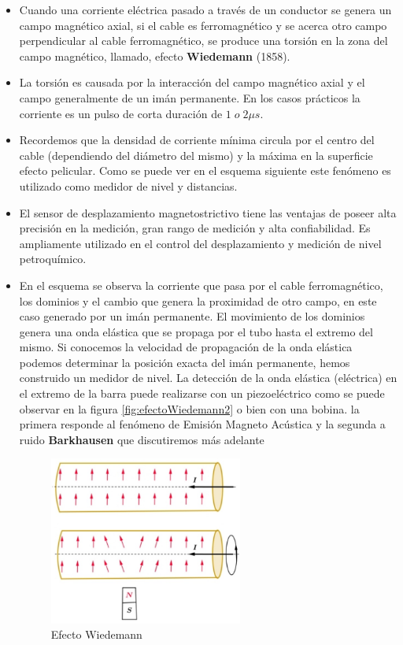 \begin{itemize}
	\item Cuando una corriente eléctrica pasado a través de un conductor se genera un campo magnético axial, si el cable es ferromagnético y se acerca otro campo perpendicular al cable ferromagnético, se produce una torsión en la zona del campo magnético, llamado, efecto \textbf{Wiedemann} (1858).

	\item La torsión es causada por la interacción del campo magnético axial y el campo generalmente de un imán permanente. En los casos prácticos la corriente es un pulso de corta duración de $1 \;o\; 2\mu s$.

	\item Recordemos que la densidad de corriente mínima circula por el centro del cable (dependiendo del diámetro del mismo) y la máxima en la superficie efecto pelicular. Como se puede ver en el esquema siguiente este fenómeno es utilizado como medidor de nivel y distancias.

	\item El sensor de desplazamiento magnetostrictivo tiene las ventajas de poseer alta precisión en la medición, gran rango de medición y alta confiabilidad. Es ampliamente utilizado en el control del desplazamiento y medición de nivel petroquímico.

	\item En el esquema se observa la corriente que pasa por el cable ferromagnético, los dominios y el cambio que genera la proximidad de otro campo, en este caso generado por un imán permanente. El movimiento de los dominios genera una onda elástica que se propaga por el tubo hasta el extremo del mismo. Si conocemos la velocidad de propagación de la onda elástica podemos determinar la posición exacta del imán permanente, hemos construido un medidor de nivel. La detección de la onda elástica (eléctrica) en el extremo de la barra puede realizarse con un piezoeléctrico como se puede observar en la figura \ref{fig:efectoWiedemann2} o bien con una bobina. la primera responde al fenómeno de Emisión Magneto Acústica y la segunda a ruido \textbf{Barkhausen} que discutiremos más adelante

\begin{figure}[H]
    \centering
    \includegraphics[width=0.6\textwidth]{./Figures/efectoWiedemann}
	\caption{Efecto Wiedemann}
	\label{fig:efectoWiedemann I}
\end{figure}

\end{itemize}


